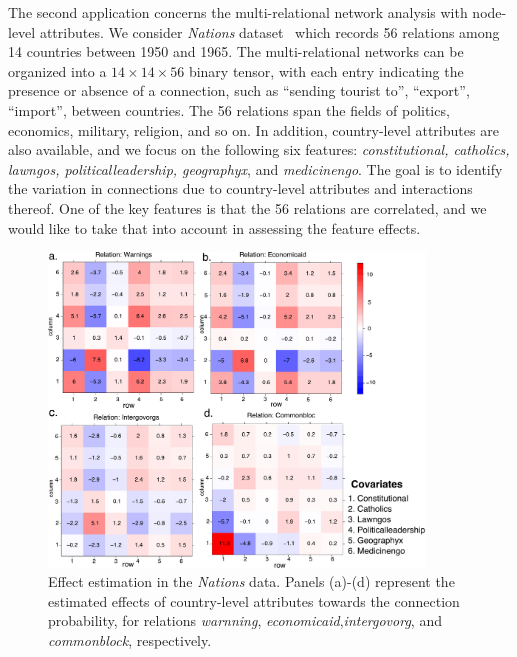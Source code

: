 \documentclass[12pt]{article}
\theoremstyle{plain}
\theoremstyle{definition}
\begin{document}
The second application concerns the multi-relational network analysis with node-level attributes. We consider \emph{Nations} dataset~\citep{nickel2011three} which records 56 relations among 14 countries between 1950 and 1965. The multi-relational networks can be organized into a $14 \times 14 \times 56$ binary tensor, with each entry indicating the presence or absence of a connection, such as ``sending tourist to'', ``export'', ``import'', between countries. The 56 relations span the fields of politics, economics, military, religion, and so on. In addition, country-level attributes are also available, and we focus on the following six features: \emph{constitutional, catholics, lawngos, politicalleadership, geographyx}, and \emph{medicinengo}. The goal is to identify the variation in connections due to country-level attributes and interactions thereof. One of the key features is that the 56 relations are correlated, and we would like to take that into account in assessing the feature effects. 

\begin{figure}[H]
\centering
\includegraphics[width=10cm]{coef.pdf}
\caption{Effect estimation in the \emph{Nations} data. Panels (a)-(d) represent the estimated effects of country-level attributes towards the connection probability, for relations \emph{warnning}, \emph{economicaid},\emph{intergovorg}, and \emph{commonblock}, respectively. }\label{fig:est}

\end{figure}
\end{document}
